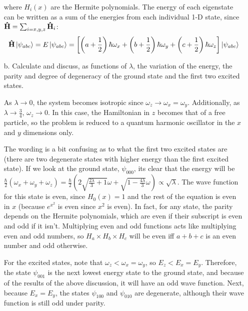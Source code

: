 \documentclass[a4paper,twoside]{article}
\begin{document}
\begin{itemize}
\begin{problem}
\begin{equation}
            \end{equation}
            where $ H_i(x) $ are the Hermite polynomials.
            The energy of each eigenstate can be written as a sum of the energies from each individual 1-D state, since $ \vu{H} = \sum_{i=x,y,z} \vu{H}_i $:
            \begin{equation}
                \vu{H}\ket{\psi_{abc}} = E\ket{\psi_{abc}} = \left[ \left( a + \frac{1}{2} \right) \hbar \omega_x + \left( b + \frac{1}{2} \right) \hbar \omega_y + \left( c + \frac{1}{2} \right) \hbar \omega_z \right]\ket{\psi_{abc}}
            \end{equation}
        \end{problem}
    \item[b.] Calculate and discuss, as functions of $ \lambda $, the variation of the energy, the parity and degree of degeneracy of the ground state and the first two excited states.
        \begin{problem}
            As $ \lambda \to 0 $, the system becomes isotropic since $ \omega_z \to \omega_x = \omega_y $. Additionally, as $ \lambda \to\frac{3}{4} $, $ \omega_z \to 0 $. In this case, the Hamiltonian in $ z $ becomes that of a free particle, so the problem is reduced to a quantum harmonic oscillator in the $ x $ and $ y $ dimensions only.

            The wording is a bit confusing as to what the first two excited states are (there are two degenerate states with higher energy than the first excited state). If we look at the ground state, $ \psi_{000} $, its clear that the energy will be $ \frac{\hbar}{2}(\omega_x + \omega_y + \omega_z) = \frac{\hbar}{2}\left( 2 \sqrt{\frac{2 \lambda }{3}+1} \omega +\sqrt{1-\frac{4 \lambda }{3}} \omega\right) \propto \sqrt{\lambda} $. The wave function for this state is even, since $ H_0(x) = 1 $ and the rest of the equation is even in $ x $ (because $ e^{x^2} $ is even since $ x^2 $ is even). In fact, for any state, the parity depends on the Hermite polynomials, which are even if their subscript is even and odd if it isn't. Multiplying even and odd functions acts like multiplying even and odd numbers, so $ H_a \times H_b \times H_c $ will be even iff $ a + b + c $ is an even number and odd otherwise.
            
            For the excited states, note that $ \omega_z < \omega_x = \omega_y $, so $ E_z < E_x = E_y $. Therefore, the state $ \psi_{001} $ is the next lowest energy state to the ground state, and because of the results of the above discussion, it will have an odd wave function. Next, because $ E_x = E_y $, the states $ \psi_{100} $ and $ \psi_{010} $ are degenerate, although their wave function is still odd under parity.


\end{problem}
\end{itemize}
\end{document}
